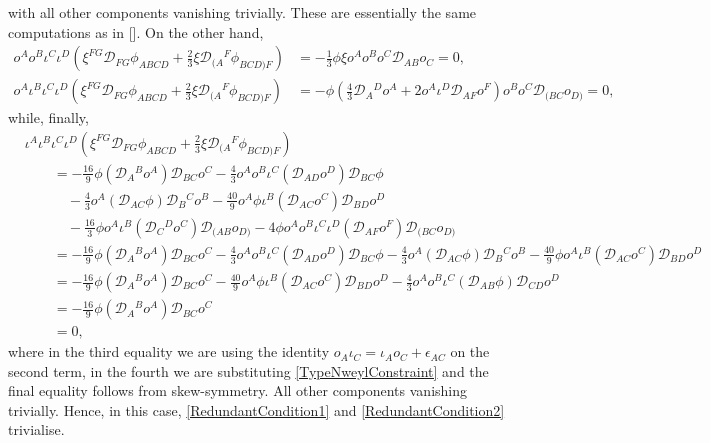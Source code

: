 \documentclass[10pt,a4paper]{article}
\newcommand\omicron{o}
\theoremstyle{plain}
\begin{document}
with all other components vanishing trivially. These are essentially the same computations as in []. On the other hand,
\begin{align*}
\omicron^A\omicron^B\iota^C\iota^D\left(\xi^{FG}\mathcal{D}_{FG}\phi_{ABCD} + \tfrac{2}{3}\xi\mathcal{D}_{(A}{}^F\phi_{BCD)F}\right)&=-\tfrac{1}{3}\phi \xi \omicron^A\omicron^B\omicron^C\mathcal{D}_{AB}\omicron_C=0,\\
\omicron^A\iota^B\iota^C\iota^D\left(\xi^{FG}\mathcal{D}_{FG}\phi_{ABCD} + \tfrac{2}{3}\xi\mathcal{D}_{(A}{}^F\phi_{BCD)F}\right)&= - \phi\left(\tfrac{4}{3} \mathcal{D}_{A}{}^{D}o^{A} + 2 o^{A}  \iota^{D} \mathcal{D}_{AF}o^{F}\right) o^{B} o^{C}\mathcal{D}_{(BC}o_{D)}=0,
\end{align*}
while, finally, 
\begin{align*}
&\iota^A\iota^B\iota^C\iota^D\left(\xi^{FG}\mathcal{D}_{FG}\phi_{ABCD} + \tfrac{2}{3}\xi\mathcal{D}_{(A}{}^F\phi_{BCD)F}\right)\\
&\qquad=- \tfrac{16}{9} \phi (\mathcal{D}_{A}{}^{B}o^{A}) \mathcal{D}_{BC}o^{C} -  \tfrac{4}{3} o^{A} o^{B} \iota^{C} (\mathcal{D}_{AD}o^{D}) \mathcal{D}_{BC}\phi \\
&\qquad\quad -  \tfrac{4}{3} o^{A} (\mathcal{D}_{AC}\phi) \mathcal{D}_{B}{}^{C}o^{B} -  \tfrac{40}{9} o^{A} \phi \iota^{B} (\mathcal{D}_{AC}o^{C}) \mathcal{D}_{BD}o^{D} \\
&\qquad\quad -  \tfrac{16}{3} \phi o^{A}  \iota^{B} (\mathcal{D}_{C}{}^{D}o^{C}) \mathcal{D}_{(AB}o_{D)} - 4\phi  o^{A} o^{B} \iota^{C} \iota^{D} (\mathcal{D}_{AF}o^{F}) \mathcal{D}_{(BC}o_{D)}\\
&\qquad =- \tfrac{16}{9} \phi (\mathcal{D}_{A}{}^{B}o^{A}) \mathcal{D}_{BC}o^{C} -  \tfrac{4}{3} o^{A} o^{B} \iota^{C} (\mathcal{D}_{AD}o^{D}) \mathcal{D}_{BC}\phi -  \tfrac{4}{3} o^{A} (\mathcal{D}_{AC}\phi) \mathcal{D}_{B}{}^{C}o^{B} -  \tfrac{40}{9}\phi  o^{A} \iota^{B} (\mathcal{D}_{AC}o^{C}) \mathcal{D}_{BD}o^{D}\\
&\qquad =- \tfrac{16}{9} \phi (\mathcal{D}_{A}{}^{B}o^{A}) \mathcal{D}_{BC}o^{C} -  \tfrac{40}{9} o^{A} \phi \iota^{B} (\mathcal{D}_{AC}o^{C}) \mathcal{D}_{BD}o^{D} -  \tfrac{4}{3} o^{A} o^{B} \iota^{C} (\mathcal{D}_{AB}\phi) \mathcal{D}_{CD}o^{D}\\
&\qquad =  - \tfrac{16}{9} \phi (\mathcal{D}_{A}{}^{B}o^{A}) \mathcal{D}_{BC}o^{C}\\
&\qquad = 0,
\end{align*}
where in the third equality we are using the identity $\omicron_A\iota_C=\iota_A\omicron_C + \epsilon_{AC}$ on the second term, in the fourth we are substituting \eqref{TypeNweylConstraint} and the final equality follows from skew-symmetry. All other components vanishing trivially. Hence, in this case, \eqref{RedundantCondition1} and \eqref{RedundantCondition2} trivialise. 
\end{document}
